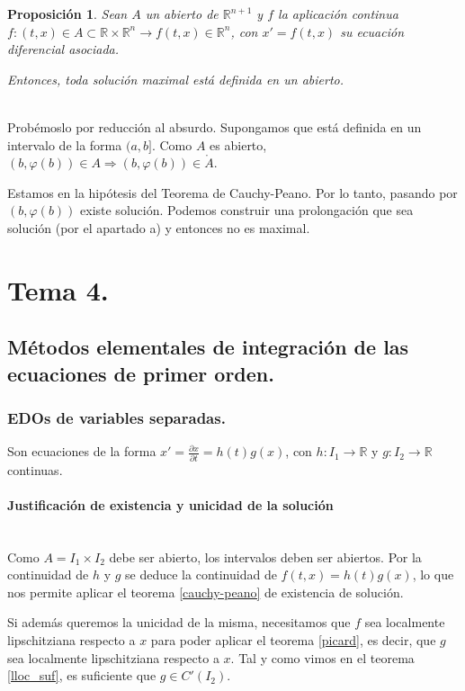 \documentclass{article}
\makeatletter
\theoremstyle{theorem-style}  %
\newtheorem{proposition}[theorem]{Proposición}
\theoremstyle{definition-style}
\theoremstyle{example-style}
\renewenvironment{proof}[1][\proofname]{\par
	\pushQED{\qed}%
	\normalfont \topsep6\p@\@plus6\p@\relax
	\list{}{%
		\settowidth{\leftmargin}{\quad:\hskip\labelsep}%
		\setlength{\labelwidth}{0pt}%
		\setlength{\itemindent}{-\leftmargin}%
	}%
	\item[\hskip\labelsep\itshape#1\@addpunct{:}]\ignorespaces
}{%
	\popQED\endlist\@endpefalse
}
\makeatother
\begin{document}
\begin{proposition}
	Sean $ A $ un abierto de $ \mathbb{R}^{n+1} $ y $ f $ la aplicación continua $ f:(t,x)\in A\subset \mathbb{R}\times \mathbb{R}^n \longrightarrow f(t,x)\in \mathbb{R}^n $, con $  x'=f(t,x) $ su ecuación diferencial asociada. 
	
	Entonces, toda solución maximal está definida en un abierto.
\end{proposition}
\begin{proof}\ \\
	Probémoslo por reducción al absurdo. Supongamos que está definida en un intervalo de la forma $ (a,b] $.
	Como $ A $ es abierto, $ (b,\varphi(b))\in A \Rightarrow (b, \varphi(b)) \in \mathring{A} $.
	
	Estamos en la hipótesis del Teorema de Cauchy-Peano. Por lo tanto, pasando por $ (b, \varphi(b)) $ existe solución. Podemos construir una prolongación que sea solución (por el apartado a) y entonces no es maximal.
\end{proof}

\pagebreak
\section{Tema 4.}
\subsection{Métodos elementales de integración de las ecuaciones de primer orden.}
\subsubsection{EDOs de variables separadas.}
Son ecuaciones de la forma $ x'=\frac{\partial x}{\partial t}=h(t)g(x) $, con $ h:I_1\longrightarrow\mathbb{R} $ y $ g:I_2\longrightarrow\mathbb{R} $ continuas. 
\paragraph{Justificación de existencia y unicidad de la solución} \ \\
Como $ A=I_1\times I_2 $ debe ser abierto, los intervalos deben ser abiertos. Por la continuidad de $ h $ y $ g $ se deduce la continuidad de $ f(t,x)=h(t)g(x) $, lo que nos permite aplicar el teorema \ref{cauchy-peano} de existencia de solución.

Si además queremos la unicidad de la misma, necesitamos que $ f $ sea localmente lipschitziana respecto a $ x $ para poder aplicar el teorema \ref{picard}, es decir, que $ g $ sea localmente lipschitziana respecto a $ x $. Tal y como vimos en el teorema \ref{lloc_suf}, es suficiente que $ g\in C'(I_2) $.
\end{document}
